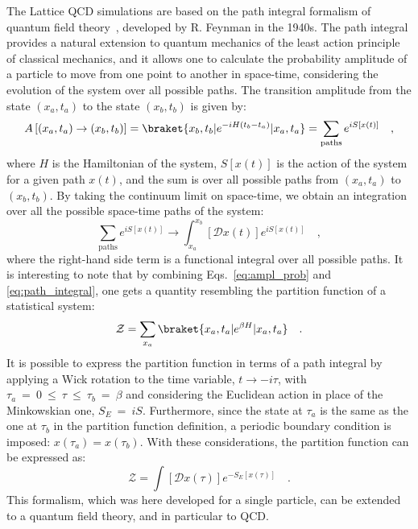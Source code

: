 The Lattice QCD simulations are based on the path integral formalism of quantum field theory~\cite{RevModPhys.20.367}, developed by R. Feynman in the 1940s. The path integral provides a natural extension to quantum mechanics of the least action principle of classical mechanics, and it allows one to calculate the probability amplitude of a particle to move from one point to another in space-time, considering the evolution of the system over all possible paths. The transition amplitude from the state $(x_a,t_a)$ to the state $(x_b,t_b)$ is given by:
\begin{equation}\label{eq:ampl_prob}
  A \left[(x_a,t_a) \rightarrow (x_b,t_b) \right] = \braket{x_b,t_b | e^{-iH(t_b-t_a)} | x_a,t_a} = \sum_\mathrm{paths} e^{iS[x(t)]}\quad , 
\end{equation}
where $H$ is the Hamiltonian of the system, $S[x(t)]$ is the action of the system for a given path $x(t)$, and the sum is over all possible paths from $(x_a,t_a)$ to $(x_b,t_b)$. By taking the continuum limit on space-time, we obtain an integration over all the possible space-time paths of the system:
\begin{equation}\label{eq:path_integral}
  \sum_\mathrm{paths} e^{iS[x(t)]} \rightarrow \int_{x_a}^{x_b} \left[\mathcal{D}x(t)\right] e^{iS[x(t)]}\quad ,
\end{equation}
where the right-hand side term is a functional integral over all possible paths. It is interesting to note that by combining Eqs.~\ref{eq:ampl_prob} and \ref{eq:path_integral}, one gets a quantity resembling the partition function of a statistical system:
\begin{equation*}
  \mathcal{Z} = \sum_{x_a} \braket{x_a,t_a | e^{\beta H} | x_a,t_a}\quad .
\end{equation*}
It is possible to express the partition function in terms of a path integral by applying a Wick rotation to the time variable, $t \rightarrow -i\tau$, with $\tau_a~=~0~\leq~\tau~\leq~\tau_b~=~\beta$ and considering the Euclidean action in place of the Minkowskian one, $S_E~=~iS$. Furthermore, since the state at $\tau_a$ is the same as the one at $\tau_b$ in the partition function definition, a periodic boundary condition is imposed: $x(\tau_a) = x(\tau_b)$. With these considerations, the partition function can be expressed as:
\begin{equation*}
  \mathcal{Z} = \int \left[\mathcal{D}x(\tau)\right] e^{-S_E[x(\tau)]}\quad .
\end{equation*}
This formalism, which was here developed for a single particle, can be extended to a quantum field theory, and in particular to QCD.

